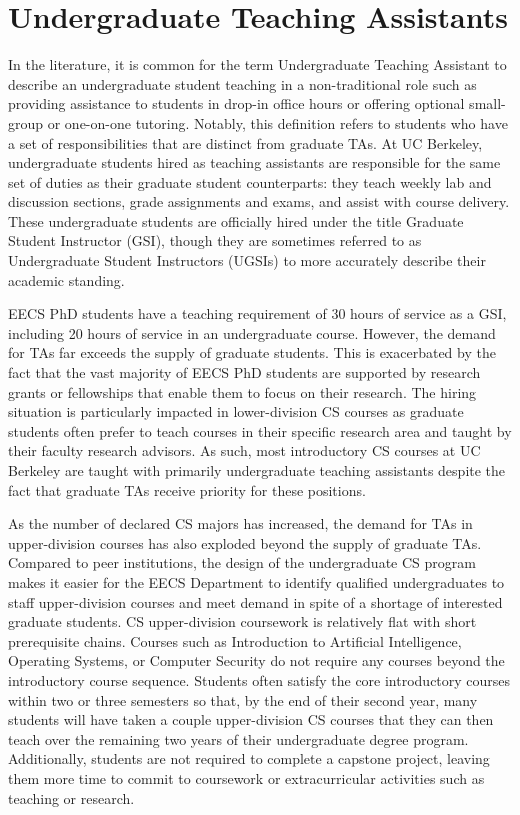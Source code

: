 \section{Undergraduate Teaching Assistants}

In the literature, it is common for the term Undergraduate Teaching Assistant to describe an undergraduate student teaching in a non-traditional role such as providing assistance to students in drop-in office hours or offering optional small-group or one-on-one tutoring. Notably, this definition refers to students who have a set of responsibilities that are distinct from graduate TAs. At UC Berkeley, undergraduate students hired as teaching assistants are responsible for the same set of duties as their graduate student counterparts: they teach weekly lab and discussion sections, grade assignments and exams, and assist with course delivery. These undergraduate students are officially hired under the title Graduate Student Instructor (GSI), though they are sometimes referred to as Undergraduate Student Instructors (UGSIs) to more accurately describe their academic standing.

EECS PhD students have a teaching requirement of 30 hours of service as a GSI, including 20 hours of service in an undergraduate course. However, the demand for TAs far exceeds the supply of graduate students. This is exacerbated by the fact that the vast majority of EECS PhD students are supported by research grants or fellowships that enable them to focus on their research. The hiring situation is particularly impacted in lower-division CS courses as graduate students often prefer to teach courses in their specific research area and taught by their faculty research advisors. As such, most introductory CS courses at UC Berkeley are taught with primarily undergraduate teaching assistants despite the fact that graduate TAs receive priority for these positions.

As the number of declared CS majors has increased, the demand for TAs in upper-division courses has also exploded beyond the supply of graduate TAs. Compared to peer institutions, the design of the undergraduate CS program makes it easier for the EECS Department to identify qualified undergraduates to staff upper-division courses and meet demand in spite of a shortage of interested graduate students. CS upper-division coursework is relatively flat with short prerequisite chains. Courses such as Introduction to Artificial Intelligence, Operating Systems, or Computer Security do not require any courses beyond the introductory course sequence. Students often satisfy the core introductory courses within two or three semesters so that, by the end of their second year, many students will have taken a couple upper-division CS courses that they can then teach over the remaining two years of their undergraduate degree program. Additionally, students are not required to complete a capstone project, leaving them more time to commit to coursework or extracurricular activities such as teaching or research.

